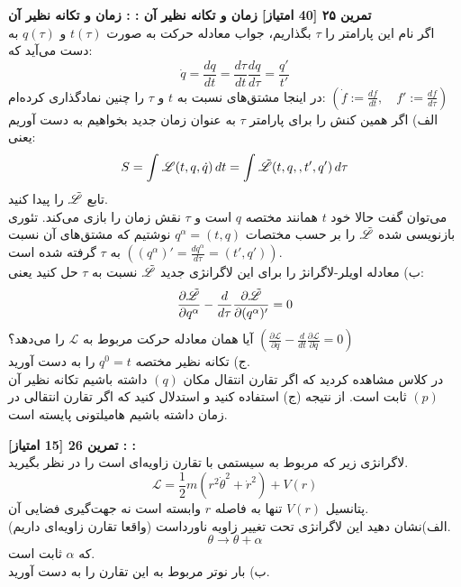 \documentclass{article}
\newenvironment{exercise}[3][\unskip]{%
	\par
	\noindent
	\textbf{تمرین
		#1
		[#2 امتیاز] 
		\def\temp{#3}\ifx\temp\empty
		: 
		\else
		: #3 \vspace{0.5em} \\ \noindent
		\fi
}}{}
\begin{document}
\begin{exercise}[۲۵]{40}{زمان و تکانه نظیر آن}
اگر نام این پارامتر را 
$\tau$ 
بگذاریم، جواب معادله حرکت به صورت 
$t(\tau)$ 
و 
$q(\tau)$ 
به دست می‌آید که: 
\begin{equation*}
    \dot{q}=\frac{dq}{dt}=\frac{d\tau}{dt}\frac{dq}{d\tau}=\frac{q'}{t'}
\end{equation*}
در اینجا مشتق‌های نسبت به 
$t$ 
و 
$\tau$ 
را چنین نمادگذاری کرده‌ام: 
$(\dot{f}:= \frac{df}{dt}, \quad f':=\frac{df}{d\tau})$
\\
الف) اگر همین کنش را برای پارامتر 
$\tau$ 
به عنوان زمان جدید بخواهیم به دست آوریم یعنی:
\begin{equation*}
    S=\int_{}^{} \mathcal{L} (t,q,\dot{q}) \,dt
    =\int_{}^{} \Tilde{\mathcal{L}} (t,q,,t',q') \,d\tau
\end{equation*}
تابع 
$\Tilde{\mathcal{L}}$ 
را پیدا کنید. 
\\
می‌توان گفت حالا خود 
$t$ 
همانند مختصه 
$q$ 
است و 
$\tau$ 
نقش زمان را بازی می‌‌کند. تئوری بازنویسی شده 
$\Tilde{\mathcal{L}}$ 
را بر حسب مختصات 
$q^{\alpha}=(t,q)$
نوشتیم که مشتق‌های آن نسبت به 
$\tau$ 
گرفته شده است
$\left((q^{\alpha})'=\frac{dq^{\alpha}}{d\tau}=(t',q')\right)$.
\\
ب) معادله اویلر-لاگرانژ را برای این لاگرانژی جدید 
$\Tilde{\mathcal{L}}$
نسبت به 
$\tau$ 
حل کنید یعنی:
\begin{equation*}
    \frac{\partial\Tilde{\mathcal{L}}}{\partial q^{\alpha}}-\frac{d}{d\tau} \frac{\partial\Tilde{\mathcal{L}}}{\partial (q^{\alpha})'}=0
\end{equation*}
آيا همان معادله حرکت مربوط به 
$\mathcal{L}$ 
را می‌دهد؟ 
$\left(    \frac{\partial\mathcal{L}}{\partial q}-\frac{d}{dt} \frac{\partial\mathcal{L}}{\partial \dot{q}}=0 \right)$
\\
ج) تکانه نظیر مختصه 
$q^0=t$ 
را به دست آورید.
\\
در کلاس مشاهده کردید که اگر تقارن انتقال مکان 
$(q)$ 
داشته باشیم تکانه نظیر آن 
$(p)$ 
ثابت است. از نتیجه (ج) استفاده کنید و استدلال کنید که اگر تقارن انتقالی در زمان داشته باشیم هامیلتونی پایسته است. 


\end{exercise}

\begin{exercise}[26]{15}{}
لاگرانژی زیر که مربوط به سیستمی با تقارن زاویه‌ای است را در نظر بگیرید.
\begin{equation*}
    \mathcal{L}=\frac{1}{2}m(r^2 \dot{\theta}^2+\dot{r}^2) + V(r)
\end{equation*}
پتانسیل 
$V(r)$ 
تنها به فاصله 
$r$ 
وابسته است نه جهت‌گیری فضایی آن.
\\
الف)‌نشان دهید این لاگرانژی تحت تغییر زاویه ناورداست (واقعا تقارن زاویه‌ای داریم). 
\begin{equation*}
    \theta \to \theta + \alpha
\end{equation*}
که 
$\alpha$ 
ثابت است.
\\
ب) بار نوتر مربوط به این تقارن را به دست آورید. 
\end{exercise}
\end{document}
